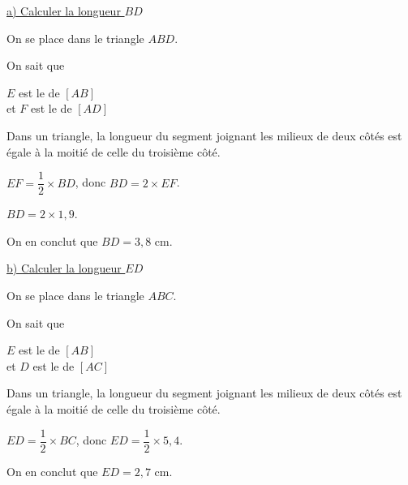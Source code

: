 \underline{a) Calculer la longueur $BD$}

\bigskip 

On se place dans le triangle $ABD$.\\

\begin{labeling}{On sait que } 
\item [On sait que ] $E$ est le   de $[AB]$ \\
                  et $F$ est le   de $[AD]$
\item [Or, ] Dans un triangle, la longueur du segment joignant les milieux  de deux côtés est  
    égale à la moitié de celle du troisième côté. 
\item [Donc] $EF=\dfrac{1}{2}\times BD$, donc $BD= 2 \times EF$.
\item [Ainsi] $BD= 2 \times 1,9$.
\end{labeling}

On en conclut que $BD = 3,8$ cm.

\bigskip 

\underline{b) Calculer la longueur $ED$}

\bigskip 
On se place dans le triangle $ABC$.\\

\begin{labeling}{On sait que } 
\item [On sait que ] $E$ est le   de $[AB]$ \\
                  et $D$ est le   de $[AC]$
\item [Or, ] Dans un triangle, la longueur du segment joignant les milieux  de deux côtés est  
    égale à la moitié de celle du troisième côté. 
\item [Donc] $ED=\dfrac{1}{2}\times BC$, donc $ED= \dfrac{1}{2} \times 5,4$.
\end{labeling}

On en conclut que $ED = 2,7$ cm.

\newpage        



\ifdefined\COMPLETE
\else
    
\fi